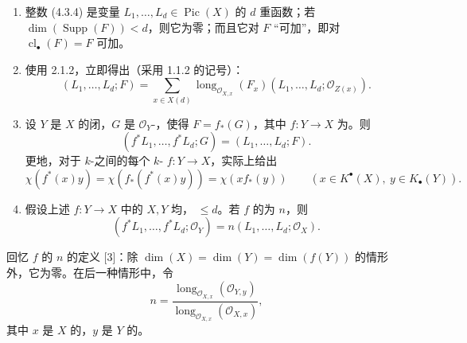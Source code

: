 \begin{enumerate}
\item[1)] 整数 (4.3.4) 是变量 $L_1,\ldots,L_d\in\operatorname{Pic}(X)$ 的 $d$ 重函数；若 $\dim(\operatorname{Supp}(F))<d$，则它为零；而且它对 $F$ “可加”，即对 $\operatorname{cl}_\bullet(F)=F$ 可加。
\item[2)] 使用 2.1.2，立即得出（采用 1.1.2 的记号）：
\[(L_1,\ldots,L_d;F)=\sum_{x\in X(d)}\operatorname{long}_{\mathcal O_{X,x}}(F_x)(L_1,\ldots,L_d;\mathcal O_{Z(x)}).\tag{4.4.1}\]
\item[3)] 设 $Y$ 是 $X$ 的闭，$G$ 是 $\mathcal O_Y$-，使得 $F=f_*(G)$，其中 $f:Y\longrightarrow X$ 为。则
\[(f^*L_1,\ldots,f^*L_d;G)=(L_1,\ldots,L_d;F).\]
更地，对于 $k$-之间的每个 $k$- $f:Y\longrightarrow X$，实际上给出
\[\chi(f^*(x)y)=\chi(f_*(f^*(x)y))=\chi(xf_*(y))\qquad(x\in K^\bullet(X),\ y\in K_\bullet(Y)).\tag{4.4.2}\]
\item[4)] 假设上述 $f:Y\longrightarrow X$ 中的 $X,Y$ 均， $\leq d$。若 $f$ 的为 $n$，则
\[(f^*L_1,\ldots,f^*L_d;\mathcal O_Y)=n(L_1,\ldots,L_d;\mathcal O_X).\tag{4.4.3}\]
\end{enumerate}
回忆 $f$ 的 $n$ 的定义 [3]：除 $\dim(X)=\dim(Y)=\dim(f(Y))$ 的情形外，它为零。在后一种情形中，令
\[n=\frac{\operatorname{long}_{\mathcal O_{X,x}}(\mathcal O_{Y,y})}{\operatorname{long}_{\mathcal O_{X,x}}(\mathcal O_{X,x})},\tag{4.4.4}\]
其中 $x$ 是 $X$ 的，$y$ 是 $Y$ 的。

